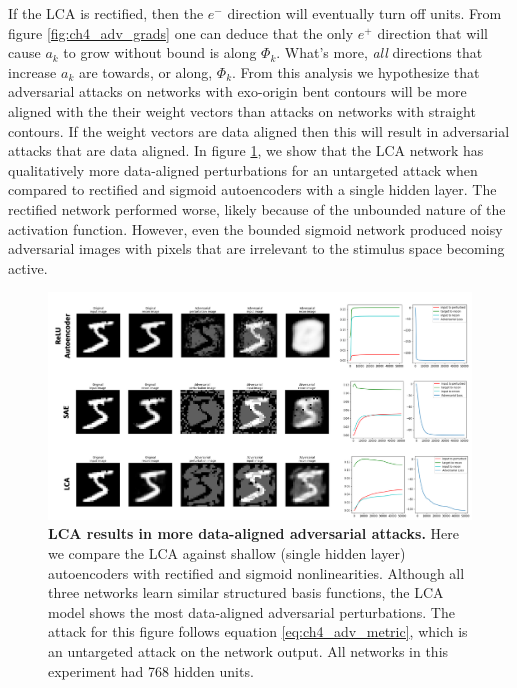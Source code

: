If the LCA is rectified, then the $e^{-}$ direction will eventually turn off units. From figure \ref{fig:ch4_adv_grads} one can deduce that the only $e^{+}$ direction that will cause $a_{k}$ to grow without bound is along $\Phi_{k}$. What's more, \emph{all} directions that increase $a_{k}$ are towards, or along, $\Phi_{k}$. From this analysis we hypothesize that adversarial attacks on networks with exo-origin bent contours will be more aligned with the their weight vectors than attacks on networks with straight contours. If the weight vectors are data aligned then this will result in adversarial attacks that are data aligned. In figure \ref{fig:ch4_marzi_network_attack}, we show that the LCA network has qualitatively more data-aligned perturbations for an untargeted attack when compared to rectified and sigmoid autoencoders with a single hidden layer. The rectified network performed worse, likely because of the unbounded nature of the activation function. However, even the bounded sigmoid network produced noisy adversarial images with pixels that are irrelevant to the stimulus space becoming active.

\begin{figure}[h]
    \centering
    \includegraphics[width=\textwidth]{figures/adv_network_marzi_lca_sae_relu.png}
    \caption{\textbf{LCA results in more data-aligned adversarial attacks.} Here we compare the LCA against shallow (single hidden layer) autoencoders with rectified and sigmoid nonlinearities. Although all three networks learn similar structured basis functions, the LCA model shows the most data-aligned adversarial perturbations. The attack for this figure follows equation \eqref{eq:ch4_adv_metric}, which is an untargeted attack on the network output. All networks in this experiment had 768 hidden units.}
    \label{fig:ch4_marzi_network_attack}
\end{figure}



